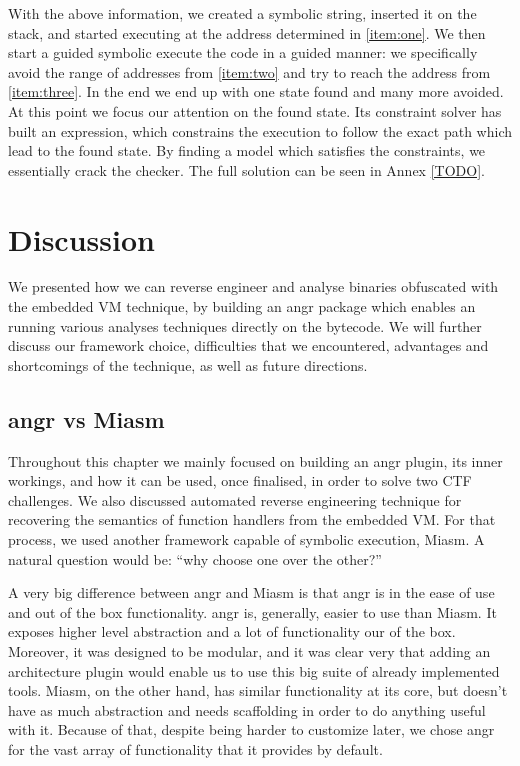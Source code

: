 With the above information, we created a symbolic string, inserted it on the stack, and started executing at the address determined in \ref{item:one}. We then start a guided symbolic execute the code in a guided manner: we specifically avoid the range of addresses from \ref{item:two} and try to reach the address from \ref{item:three}. In the end we end up with one state found and many more avoided. At this point we focus our attention on the found state. Its constraint solver has built an expression, which constrains the execution to follow the exact path which lead to the found state. By finding a model which satisfies the constraints, we essentially crack the checker. The full solution can be seen in Annex \ref{TODO}.

\section{Discussion}

We presented how we can reverse engineer and analyse binaries obfuscated with the embedded \gls{VM} technique, by building an angr package which enables an running various analyses techniques directly on the bytecode. We will further discuss our framework choice, difficulties that we encountered, advantages and shortcomings of the technique, as well as future directions.

\subsection{angr vs Miasm}

Throughout this chapter we mainly focused on building an angr plugin, its inner workings, and how it can be used, once finalised, in order to solve two \gls{CTF} challenges. We also discussed automated reverse engineering technique for recovering the semantics of function handlers from the embedded \gls{VM}. For that process, we used another framework capable of symbolic execution, Miasm. A natural question would be: ``why choose one over the other?'' 

A very big difference between angr and Miasm is that angr is in the ease of use and out of the box functionality. angr is, generally, easier to use than Miasm. It exposes higher level abstraction and a lot of functionality our of the box. Moreover, it was designed to be modular, and it was clear very that adding an architecture plugin would enable us to use this big suite of already implemented tools. Miasm, on the other hand, has similar functionality at its core, but doesn't have as much abstraction and needs scaffolding in order to do anything useful with it. Because of that, despite being harder to customize later, we chose angr for the vast array of functionality that it provides by default.

